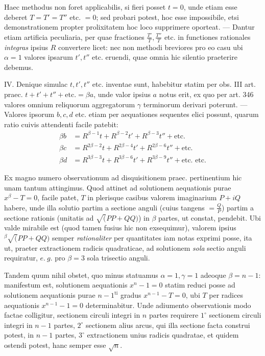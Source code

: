 Haec methodus non foret applicabilis, si fieri posset \(t=0\), unde etiam esse deberet \(T=T'=T''\) etc. \(=0\); sed probari potest, hoc esse impossibile, etsi demonstrationem propter prolixitatem hoc loco supprimere oporteat. — Dantur etiam artificia peculiaria, per quae fractiones \(\frac{T'}T,\allowbreak \frac{T''}T\) etc. in functiones rationales \textit{integras} ipsius \(R\) convertere licet: nec non methodi breviores pro eo casu ubi \(\alpha=1\) valores ipsarum \(t',\allowbreak t''\) etc. eruendi, quae omnia hic silentio praeterire debemus.

IV. Denique simulac \(t,\allowbreak t',\allowbreak t''\) etc. inventae sunt, habebitur statim per obs. III art. praec. \(t+t'+t''+\text{etc.}=\beta a\), unde valor ipsius \(a\) notus erit, ex quo per art. 346 valores omnium reliquorum aggregatorum \(\gamma\) terminorum derivari poterunt. — Valores ipsorum \(b,\allowbreak c,\allowbreak d\) etc. etiam per aequationes sequentes elici possunt, quarum ratio cuivis attendenti facile patebit: \[\begin{aligned}\beta b&=R^{\beta-1}t+R^{\beta-2}t'+R^{\beta-3}t''+\text{etc.}\\\beta c&=R^{2\beta-2}t+R^{2\beta-4}t'+R^{2\beta-6}t''+\text{etc.}\\\beta d&=R^{3\beta-3}t+R^{3\beta-6}t'+R^{3\beta-9}t''+\text{etc. etc.}\end{aligned}\]

Ex magno numero observationum ad disquisitionem praec. pertinentium hic unam tantum attingimus. Quod attinet ad solutionem aequationis purae \(x^\beta-T=0\), facile patet, \(T\) in plerisque casibus valorem imaginarium \(P+iQ\) habere, unde illa solutio partim a sectione anguli (cuius tangens \(=\frac QP\)) partim a sectione rationis (unitatis ad \(\surd(PP+QQ)\)) in \(\beta\) partes, ut constat, pendebit. Ubi valde mirabile est (quod tamen fusius hic non exsequimur), valorem ipsius \({}^{\beta}\!\surd(PP+QQ)\) semper \textit{rationaliter} per quantitates iam notas exprimi posse, ita ut, praeter extractionem radicis quadraticae, ad solutionem \textit{sola} sectio anguli requiratur, \(e.\ g.\) pro \(\beta=3\) sola trisectio anguli.

Tandem quum nihil obstet, quo minus statuamus \(\alpha=1,\allowbreak \gamma=1\) adeoque
\(\beta=n-1\): manifestum est, solutionem aequationis \(x^n-1=0\) statim reduci posse ad solutionem aequationis purae \(n-1^{\mathrm{ti}}\) gradus \(x^{n-1}-T=0\), ubi \(T\) per radices aequationis \(x^{n-1}-1=0\) determinabitur. Unde adiumento observationis modo factae colligitur, sectionem circuli integri in \(n\) partes requirere \(1^\circ\) sectionem circuli integri in \(n-1\) partes, \(2^\circ\) sectionem alius arcus, qui illa sectione facta construi potest, in \(n-1\) partes, \(3^\circ\) extractionem unius radicis quadratae, et quidem ostendi potest, hanc semper esse \(\surd n\).

